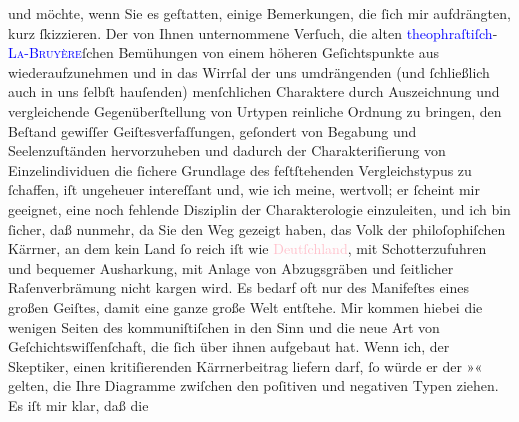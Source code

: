                und möchte, wenn Sie es geſtatten, einige Bemerkungen, die ſich mir aufdrängten, kurz
               ſkizzieren.\pend
           \pstart
           Der von Ihnen unternommene Verſuch, die alten \textcolor{blue}{theophraſtiſch}{}\ledrightnote{\textcolor{blue}{Theophrast von Eresos}}-\textcolor{blue}{\textsc{La-Bruyère}}{}\ledrightnote{\textcolor{blue}{Jean de La Bruyère}}ſchen Bemühungen von einem höheren Geſichtspunkte aus wiederaufzunehmen und in
               das Wirrſal der uns umdrängenden (und ſchließlich auch in uns ſelbſt hauſenden)
               menſchlichen Charaktere durch Auszeichnung und vergleichende Gegenüberſtellung von
               Urtypen reinliche Ordnung zu bringen, den Beſtand gewiſſer Geiſtesverfaſſungen,
               geſondert von Begabung und Seelenzuſtänden hervorzuheben und dadurch der
               Charakteriſierung von Einzelindividuen die ſichere Grundlage des feſtſtehenden
               Vergleichstypus {\pb}zu ſchaffen, iſt
               ungeheuer intereſſant und, wie ich meine, wertvoll; er ſcheint mir geeignet, eine
               noch fehlende Disziplin der Charakterologie einzuleiten, und ich bin ſicher, daß
               nunmehr, da Sie den Weg gezeigt haben, das Volk der philoſophiſchen Kärrner, an dem
               kein Land ſo reich iſt wie \textcolor{pink}{Deutſchland}{}\ledrightnote{\textcolor{pink}{Deutschland}}, mit
               Schotterzufuhren und bequemer Ausharkung, mit Anlage von Abzugsgräben und ſeitlicher
               Raſenverbrämung nicht kargen wird. Es bedarf oft nur des Manifeſtes \introOben{}\label{T_L02483_1v}\label{T_L02483_1h}\introOben{} eines großen Geiſtes, damit eine ganze große Welt entſtehe. Mir kommen hiebei
               die wenigen Seiten des kommuniſtiſchen in den Sinn und  die neue Art von Geſchichtswiſſenſchaft, die ſich über ihnen aufgebaut
               hat.\pend
           \pstart
           Wenn ich, der Skeptiker, einen {\pb}kritiſierenden Kärrnerbeitrag liefern darf, ſo würde er der »\label{K_L02483_1v}\label{K_L02483_1h}« gelten, die Ihre
               Diagramme zwiſchen den poſitiven und negativen Typen ziehen. Es iſt mir klar, daß die
